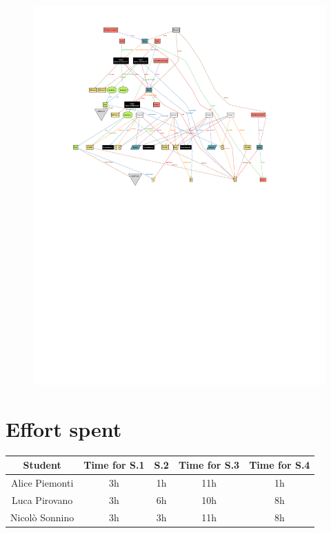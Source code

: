 \documentclass[table, 12pt]{article}
\begin{document}
\begin{flushleft}
\begin{landscape}
\begin{figure}[H]
            \includegraphics[scale=1.5]{assets/world3.pdf}
        \end{figure}
    \end{landscape}
    \pagestyle{plain}
    \section{Effort spent}
    \begin{tabular}{ | c || c | c | c | c|}
        \hline
        Student        & Time for S.1 & S.2 & Time for S.3 & Time for S.4 \\ \hline
        Alice Piemonti & 3h           & 1h  & 11h          & 1h           \\ \hline
        Luca Pirovano  & 3h           & 6h  & 10h          & 8h           \\ \hline
        Nicolò Sonnino & 3h           & 3h  & 11h          & 8h           \\
        \hline
    \end{tabular}
\end{flushleft}
\end{document}
